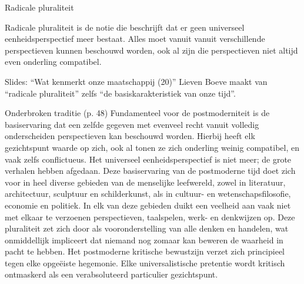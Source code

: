 \documentclass[main.tex]{subfiles}
\begin{document}
\begin{examenvraag}
    \begin{vraag}
        Radicale pluraliteit
    \end{vraag}

    \begin{antwoord}
        Radicale pluraliteit is de notie die beschrijft dat er geen universeel eenheidsperspectief meer bestaat.
        Alles moet vanuit vanuit verschillende perspectieven kunnen beschouwd worden, ook al zijn die perspectieven niet altijd even onderling compatibel.
        \begin{citaat}{Slides: ``Wat kenmerkt onze maatschappij (20)''}
            Lieven Boeve maakt van “radicale pluraliteit” zelfs “de basiskarakteristiek van onze tijd”.
        \end{citaat}
        \begin{citaat}{Onderbroken traditie (p. 48)}
            Fundamenteel voor de postmoderniteit is de basiservaring dat een zelfde gegeven met evenveel recht vanuit volledig onderscheiden perspectieven kan beschouwd worden.
            Hierbij heeft elk gezichtspunt waarde op zich, ook al tonen ze zich onderling weinig compatibel, en vaak zelfs conflictueus.
            Het universeel eenheidsperspectief is niet meer; de grote verhalen hebben afgedaan.
            Deze basiservaring van de postmoderne tijd doet zich voor in heel diverse gebieden van de menselijke leefwereld, zowel in literatuur, architectuur, sculptuur en schilderkunst, als in cultuur- en wetenschapsfilosofie, economie en politiek.
            In elk van deze gebieden duikt een veelheid aan vaak niet met elkaar te verzoenen perspectieven, taalspelen, werk- en denkwijzen op.
            Deze pluraliteit zet zich door als vooronderstelling van alle denken en handelen, wat onmiddellijk impliceert dat niemand nog zomaar kan beweren de waarheid in pacht te hebben.
            Het postmoderne kritische bewustzijn verzet zich principieel tegen elke opgeëiste hegemonie.
            Elke universalistische pretentie wordt kritisch ontmaskerd als een verabsoluteerd particulier gezichtspunt.
        \end{citaat}
    \end{antwoord}
\end{examenvraag}
\end{document}
